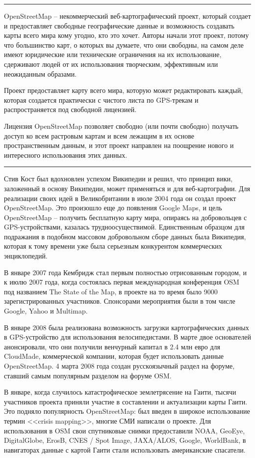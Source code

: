 \hrule

OpenStreetMap -- некоммерческий веб-картографический проект, который создает и 
предоставляет свободные географические данные и возможность создавать карты 
всего мира кому угодно, кто это хочет. Авторы начали этот проект, потому что 
большинство карт, о которых вы думаете, что они свободны, на самом деле имеют 
юридические или технические ограничения на их использование, сдерживают людей 
от их использования творческим, эффективным или неожиданным образами. 

Проект предоставляет карту всего мира, которую может редактировать каждый, 
которая создается практически с чистого листа по GPS-трекам и распространяется 
под свободной лицензией.

Лицензия OpenStreetMap позволяет свободно (или почти свободно) получать доступ 
ко всем растровым картам и всем лежащим в их основе пространственным 
данным, и этот проект направлен на поощрение нового и интересного 
использования этих данных.\cite{osmwiki}

\hrule

Стив Кост был вдохновлен успехом Википедии и решил, что принцип вики, 
заложенный в основу Википедии, может применяться и для веб-картографии. Для 
реализации своих идей в Великобритании в июле 2004 года он создал проект 
OpenStreetMap. Это произошло еще до появления Google Maps, и цель 
OpenStreetMap -- получить бесплатную карту мира, опираясь на добровольцев с 
GPS-устройствами, казалась трудноосуществимой. Единственным образцом для 
подражания в подобном массовом добровольном сборе данных была Википедия, 
которая к тому времени уже была серьезным конкурентом коммерческих 
энциклопедий.

В январе 2007 года Кембридж стал первым полностью отрисованным городом, и к 
июлю 2007 года, когда состоялась первая международная конференция OSM под 
названием The State of the Map, в проекте на то время было 9000 
зарегистрированных участников. Спонсорами мероприятия были в том числе Google, 
Yahoo и Multimap.

В январе 2008 была реализована возможность загрузки картографических данных в 
GPS-устройство для использования велосипедистами. В марте двое основателей
анонсировали, что они получили венчурный капитал в 2.4 млн евро для CloudMade,
коммерческой компании, которая будет использовать данные OpenStreetMap.
4 марта 2008 года создан русскоязычный раздел на форуме, ставший самым
популярным разделом на форуме OSM.

В январе, когда случилось катастрофическое землетрясение на Гаити, тысячи 
участников проекта приняли участие в составлении и актуализации карты Гаити. 
Это подняло популярность OpenStreetMap: был введен в широкое использование 
термин <<crisis mapping>>, многие СМИ написали о проекте. Для использования в 
OSM свои спутниковые снимки предоставили NOAA, GeoEye, DigitalGlobe, ErosB, 
CNES / Spot Image, JAXA/ALOS, Google, WorldBank, в навигаторах данные с картой 
Гаити стали использовать американские спасатели.

